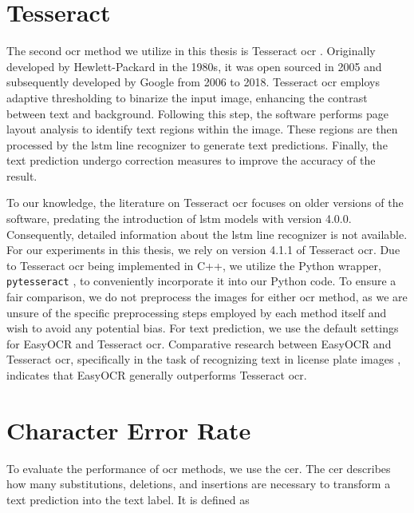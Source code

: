 \section{Tesseract}
\label{subsec:tesseract}

The second \gls{ocr} method we utilize in this thesis is Tesseract \gls{ocr} \cite{tesseract_legacy_2007}\cite{tesseract_github_2023}\cite{tesseract_architecture_2016}.
Originally developed by Hewlett-Packard in the 1980s, it was open sourced in 2005 and subsequently developed by Google from 2006 to 2018.
Tesseract \gls{ocr} employs adaptive thresholding to binarize the input image, enhancing the contrast between text and background.
Following this step, the software performs page layout analysis to identify text regions within the image.
These regions are then processed by the \gls{lstm} line recognizer to generate text predictions.
Finally, the text prediction undergo correction measures to improve the accuracy of the result.

To our knowledge, the literature on Tesseract \gls{ocr} focuses on older versions of the software, predating the introduction of \gls{lstm} models with version 4.0.0.
Consequently, detailed information about the \gls{lstm} line recognizer is not available.
For our experiments in this thesis, we rely on version 4.1.1 of Tesseract \gls{ocr}.
Due to Tesseract \gls{ocr} being implemented in C++, we utilize the Python wrapper, \texttt{pytesseract} \cite{pytesseract_2022}, to conveniently incorporate it into our Python code.
To ensure a fair comparison, we do not preprocess the images for either \gls{ocr} method, as we are unsure of the specific preprocessing steps employed by each method itself and wish to avoid any potential bias.
For text prediction, we use the default settings for EasyOCR and Tesseract \gls{ocr}.
Comparative research between EasyOCR and Tesseract \gls{ocr}, specifically in the task of recognizing text in license plate images \cite{ocr_tess_vs_easyocr_2022}, indicates that EasyOCR generally outperforms Tesseract \gls{ocr}.



\section{Character Error Rate}
\label{subsec:cer}

To evaluate the performance of \gls{ocr} methods, we use the \gls{cer}.
The \gls{cer} \cite{cer_2022} describes how many substitutions, deletions, and insertions are necessary to transform a text prediction into the text label.
It is defined as

